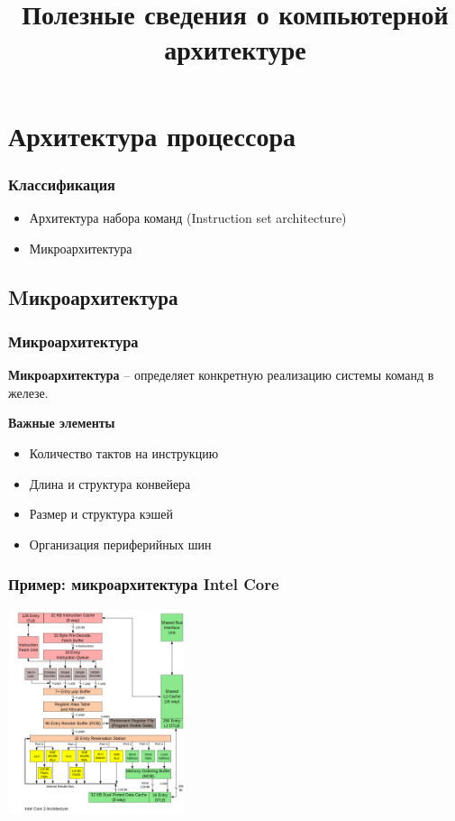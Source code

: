 

\title{Полезные сведения о компьютерной архитектуре}



\begin{frame}
  \frametitle{}
\end{frame}

\section{Архитектура процессора}
\begin{frame}
 \frametitle{Классификация}
 \begin{itemize}
   \item Архитектура набора команд (Instruction set architecture)
   \item Микроархитектура
 \end{itemize}
\end{frame}
\subsection{Mикроархитектура}
\begin{frame}
 \frametitle{Микроархитектура}
 \textbf{Микроархитектура} -- определяет конкретную реализацию системы команд в железе. 

 \textbf{Важные элементы}
 \begin{itemize}
  \item Количество тактов на инструкцию
  \item Длина и структура конвейера
  \item Размер и структура кэшей
  \item Организация периферийных шин
 \end{itemize}
\end{frame}

\begin{frame}
  \frametitle{Пример: микроархитектура Intel Core}
  \includegraphics[height=6cm]{Intel_Core2_arch.png}
\end{frame}
